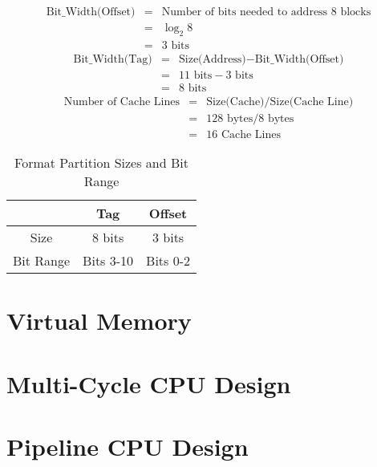 \documentclass[11pt]{article}
\begin{document}
\begin{eqnarray*}
	\text{Bit\_Width(Offset)} &=& \text{Number of bits needed to address 8 blocks}\\
	&=& \log_2 8\\
	&=& 3 \text{ bits}
\end{eqnarray*}
\begin{eqnarray*}
	\text{Bit\_Width(Tag)} &=& \text{Size(Address)} - \text{Bit\_Width(Offset)}\\
	&=& 11 \text{ bits} - 3 \text{ bits}\\
	&=& 8 \text{ bits}
\end{eqnarray*}
\begin{eqnarray*}
	\text{Number of Cache Lines} &=& \text{Size(Cache)} / \text{Size(Cache Line)}\\
	&=& 128 \text{ bytes} / 8 \text{ bytes}\\
	&=& 16 \text{ Cache Lines}
\end{eqnarray*}

\begin{table}[H]
	\centering
	\caption*{Format Partition Sizes and Bit Range}
	\begin{tabular}{| c | c | c |}
		\hline
		&	Tag		&	Offset\\
		\hline
		Size		&	8 bits		&	3 bits\\
		\hline
		Bit Range	&	Bits 3-10	&	Bits 0-2\\
		\hline
	\end{tabular}
\end{table}


\section{Virtual Memory}

\section{Multi-Cycle CPU Design}

\section{Pipeline CPU Design}
\end{document}
